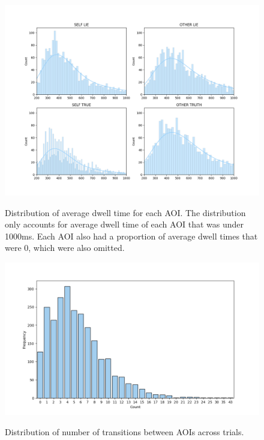 \documentclass[man, floatsintext]{apa7}
\begin{document}
\begin{figure}[H]
	\caption{Distribution of average dwell time for each AOI. The distribution only accounts for average dwell time of each AOI that was under 1000ms. Each AOI also had a proportion of average dwell times that were 0, which were also omitted.}
	\includegraphics[width=\linewidth]{../plots/Dwell/DwellDistPlot.png}
	\label{fig:DwellDistPlot}
\end{figure}


\begin{figure}[H]
	\caption{Distribution of number of transitions between AOIs across trials.}
	\includegraphics[width=\linewidth]{../plots/Dwell/N_TransitionsDistPlot.png}
	\label{fig:NTransitionsDistPlot}
\end{figure}
\end{document}
